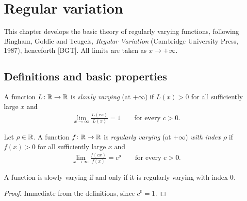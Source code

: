 \chapter{Regular variation}

This chapter develops the basic theory of regularly varying functions,
following Bingham, Goldie and Teugels, \emph{Regular Variation} (Cambridge
University Press, 1987), henceforth [BGT]. All limits are taken as $x \to +\infty$.

\section{Definitions and basic properties}

\begin{definition}
  \label{def:slowly-varying}
  \leanok
  A function $L \colon \mathbb{R} \to \mathbb{R}$ is \emph{slowly varying} (at $+\infty$)
  if $L(x) > 0$ for all sufficiently large $x$ and
  \begin{align*}
    \lim_{x \to \infty} \frac{L(c x)}{L(x)} = 1 \qquad \text{for every } c > 0 .
  \end{align*}
\end{definition}

\begin{definition}
  \label{def:regularly-varying}
  \leanok
  Let $\rho \in \mathbb{R}$. A function $f \colon \mathbb{R} \to \mathbb{R}$ is \emph{regularly varying}
  (at $+\infty$) \emph{with index $\rho$} if $f(x) > 0$ for all sufficiently large $x$ and
  \begin{align*}
    \lim_{x \to \infty} \frac{f(c x)}{f(x)} = c^\rho \qquad \text{for every } c > 0 .
  \end{align*}
\end{definition}

\begin{lemma}
  \label{lem:slowly-varying-iff-rv-zero}
  \leanok
  A function is slowly varying if and only if it is regularly varying with index $0$.
\end{lemma}
\begin{proof}
  \leanok
  Immediate from the definitions, since $c^0 = 1$.
\end{proof}

